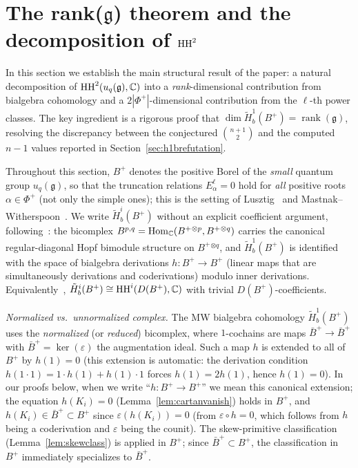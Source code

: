 
\section{The rank(\texorpdfstring{$\mathfrak{g}$}{g}) theorem and the decomposition of \texorpdfstring{$\operatorname{HH}^2$}{HH2}}
\label{sec:ranktheorem}

In this section we establish the main structural result of the paper: a natural decomposition of $\operatorname{HH}^2(u_q(\mathfrak{g}), \mathbb{C})$ into a \emph{rank}-dimensional contribution from bialgebra cohomology and a $2|\Phi^+|$-dimensional contribution from the $\ell$-th power classes. The key ingredient is a rigorous proof that $\dim \tilde{H}^1_b(B^+) = \operatorname{rank}(\mathfrak{g})$, resolving the discrepancy between the conjectured $\binom{n+1}{2}$ and the computed $n - 1$ values reported in Section~\ref{sec:h1brefutation}.

\begin{remark}
\label{rem:coeffs}
Throughout this section, $B^+$ denotes the positive Borel of the \emph{small} quantum group $u_q(\mathfrak{g})$, so that the truncation relations $E_\alpha^\ell = 0$ hold for \emph{all} positive roots $\alpha \in \Phi^+$ (not only the simple ones); this is the setting of Lusztig~\cite{Lus93} and Mastnak--Witherspoon~\cite{MW08}. We write $\tilde{H}^i_b(B^+)$ without an explicit coefficient argument, following~\cite[\S 2.1]{MW08}: the bicomplex $B^{p,q} = \operatorname{Hom}_{\mathbb{C}}(B^+{}^{\otimes p}, B^+{}^{\otimes q})$ carries the canonical regular-diagonal Hopf bimodule structure on $B^+{}^{\otimes q}$, and $\tilde{H}^1_b(B^+)$ is identified with the space of bialgebra derivations $h \colon B^+ \to B^+$ (linear maps that are simultaneously derivations and coderivations) modulo inner derivations. Equivalently~\cite[Thm 3.2.1]{MW08}, $\tilde{H}^i_b(B^+) \cong \operatorname{HH}^i(D(B^+), \mathbb{C})$ with trivial $D(B^+)$-coefficients.

\emph{Normalized vs.\ unnormalized complex.} The MW bialgebra cohomology $\tilde{H}^1_b(B^+)$ uses the \emph{normalized} (or \emph{reduced}) bicomplex, where $1$-cochains are maps $\bar{B}^+ \to \bar{B}^+$ with $\bar{B}^+ = \ker(\varepsilon)$ the augmentation ideal. Such a map $h$ is extended to all of $B^+$ by $h(1) = 0$ (this extension is automatic: the derivation condition $h(1 \cdot 1) = 1 \cdot h(1) + h(1) \cdot 1$ forces $h(1) = 2h(1)$, hence $h(1) = 0$). In our proofs below, when we write ``$h \colon B^+ \to B^+$'' we mean this canonical extension; the equation $h(K_i) = 0$ (Lemma~\ref{lem:cartanvanish}) holds in $B^+$, and $h(K_i) \in \bar{B}^+ \subset B^+$ since $\varepsilon(h(K_i)) = 0$ (from $\varepsilon \circ h = 0$, which follows from $h$ being a coderivation and $\varepsilon$ being the counit). The skew-primitive classification (Lemma~\ref{lem:skewclass}) is applied in $B^+$; since $\bar{B}^+ \subset B^+$, the classification in $B^+$ immediately specializes to $\bar{B}^+$.
\end{remark}

